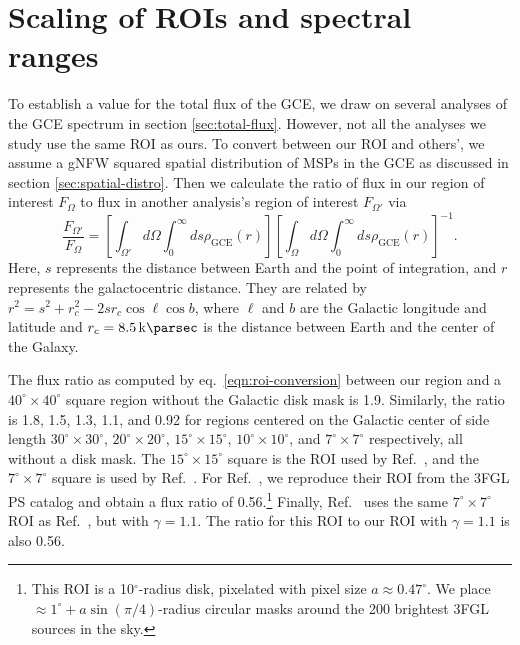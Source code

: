 \documentclass[letter,11pt]{article}
\newcommand{\brackets}[1]{\left[#1\right]}
\begin{document}






\appendix
\section{Scaling of ROIs and spectral ranges}
\label{app:roi-rescale}
To establish a value for the total flux of the GCE, we draw on several analyses of the GCE spectrum in section \ref{sec:total-flux}. However, not all the analyses we study use the same ROI as ours. To convert between our ROI and others', we assume a gNFW squared spatial distribution of MSPs in the GCE as discussed in section \ref{sec:spatial-distro}. Then we calculate the ratio of flux in our region of interest $F_\Omega$ to flux in another analysis's region of interest $F_{\Omega'}$ via
\begin{equation}
    \frac{F_{\Omega'}}{F_\Omega} = \brackets{\int_{\Omega'}d\Omega\int_0^\infty ds \rho_\text{GCE} (r)}\brackets{\int_{\Omega}d\Omega\int_0^\infty ds \rho_\text{GCE} (r)}^{-1}.
    \label{eqn:roi-conversion}
\end{equation}
Here, $s$ represents the distance between Earth and the point of integration, and $r$ represents the galactocentric distance. They are related by $r^2 = s^2 + r_c^2 - 2 s r_c \cos\ell\cos b$, where $\ell$ and $b$ are the Galactic longitude and latitude and $r_c=\SI{8.5}{\kilo\parsec}$ is the distance between Earth and the center of the Galaxy.

The flux ratio as computed by eq.~\ref{eqn:roi-conversion} between our region and a $40^\circ \times 40^\circ$ square region without the Galactic disk mask is 1.9. Similarly, the ratio is 1.8, 1.5, 1.3, 1.1, and 0.92 for regions centered on the Galactic center of side length $30^\circ \times 30^\circ $, $20^\circ \times 20^\circ$, $15^\circ \times 15^\circ$, $10^\circ \times 10^\circ$, and $7^\circ \times 7^\circ$ respectively, all without a disk mask. The $15^\circ \times 15^\circ$ square is the ROI used by Ref.~\cite{Ajello:2015kwa}, and the $7^\circ \times 7^\circ$ square is used by Ref.~\cite{Gordon13}. For Ref.~\cite{Ajello:2017opo}, we reproduce their ROI from the 3FGL PS catalog \cite{Fermi-LAT:2015bhf} and obtain a flux ratio of 0.56.\footnote{This ROI is a 10$^\circ$-radius disk, pixelated with pixel size $a\approx 0.47^\circ$. We place $\approx 1^\circ + a \sin(\pi/4)$-radius circular masks around the 200 brightest 3FGL sources in the sky.} Finally, Ref.~\cite{Abazajian:2014fta} uses the same $7^\circ \times 7^\circ$ ROI as Ref.~\cite{Gordon13}, but with $\gamma=1.1$. The ratio for this ROI to our ROI with $\gamma=1.1$ is also 0.56.
\end{document}
